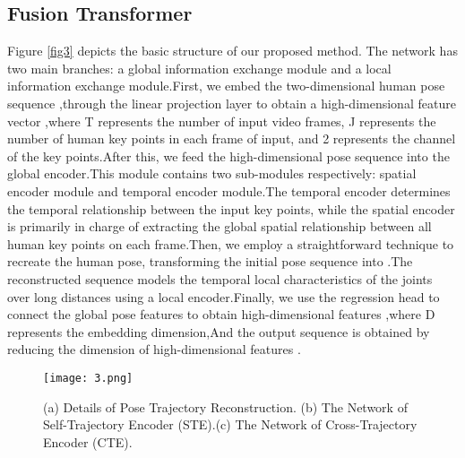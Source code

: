 \documentclass{article}
\begin{document}
\subsection{Fusion Transformer}
Figure \ref{fig3} depicts the basic structure of our proposed method. The network has two main branches: a global information exchange module and a local information exchange module.First, we embed the two-dimensional human pose sequence  ,through the linear projection layer to obtain a high-dimensional feature vector ,where T represents the number of input video frames, J represents the number of human key points in each frame of input, and 2 represents the channel of the key points.After this, we feed the high-dimensional pose sequence into the global encoder.This module contains two sub-modules respectively: spatial encoder module and temporal encoder module.The temporal encoder determines the temporal relationship between the input key points, while the spatial encoder is primarily in charge of extracting the global spatial relationship between all human key points on each frame.Then, we employ a straightforward technique to recreate the human pose, transforming the initial pose sequence into .The reconstructed sequence models the temporal local characteristics of the joints over long distances using a local encoder.Finally, we use the regression head to connect the global pose features to obtain high-dimensional features ,where D represents the embedding dimension,And the output sequence is obtained by reducing the dimension of high-dimensional features .\\
\begin{figure}
\centering
\texttt{[image: 3.png]} 
\caption{\label{fig4}(a) Details of Pose Trajectory Reconstruction. (b) The Network of Self-Trajectory Encoder (STE).(c) The Network of Cross-Trajectory Encoder (CTE).}
\end{figure}
\end{document}
